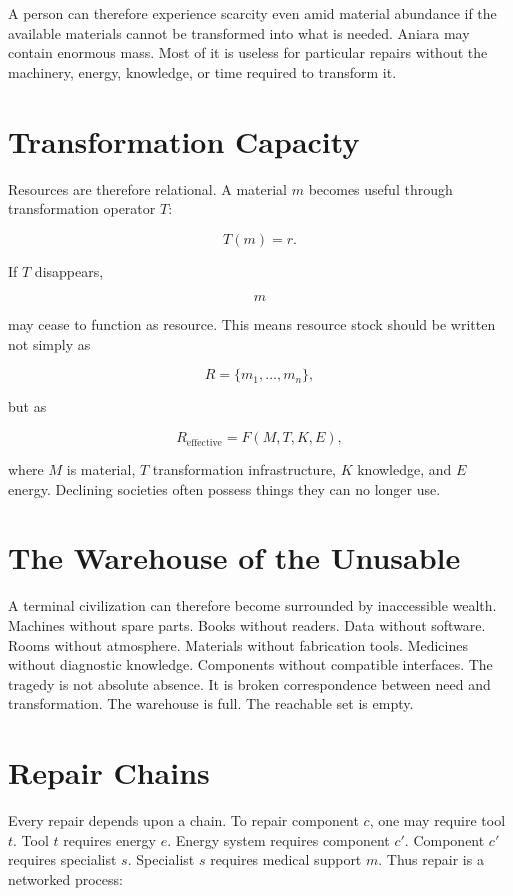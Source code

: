 \documentclass[11pt,oneside]{book}
\theoremstyle{definition}
\theoremstyle{remark}
\begin{document}
A person can therefore experience scarcity even amid material abundance if the available materials
cannot be transformed into what is needed. Aniara may contain enormous mass. Most of it is useless
for particular repairs without the machinery, energy, knowledge, or time required to transform it.

\section{Transformation Capacity}

Resources are therefore relational. A material \(m\) becomes useful through transformation operator
\(T\):

\[
T(m)=r.
\]

If \(T\) disappears,

\[
m
\]

may cease to function as resource. This means resource stock should be written not simply as

\[
R=\{m_1,\ldots,m_n\},
\]

but as

\[
R_{\mathrm{effective}} = F(M,T,K,E),
\]

where \(M\) is material, \(T\) transformation infrastructure, \(K\) knowledge, and \(E\) energy.
Declining societies often possess things they can no longer use.

\section{The Warehouse of the Unusable}

A terminal civilization can therefore become surrounded by inaccessible wealth. Machines without
spare parts. Books without readers. Data without software. Rooms without atmosphere. Materials
without fabrication tools. Medicines without diagnostic knowledge. Components without compatible
interfaces. The tragedy is not absolute absence. It is broken correspondence between need and
transformation. The warehouse is full. The reachable set is empty.

\section{Repair Chains}

Every repair depends upon a chain. To repair component \(c\), one may require tool \(t\). Tool \(t\)
requires energy \(e\). Energy system requires component \(c'\). Component \(c'\) requires specialist
\(s\). Specialist \(s\) requires medical support \(m\). Thus repair is a networked process:
\end{document}
